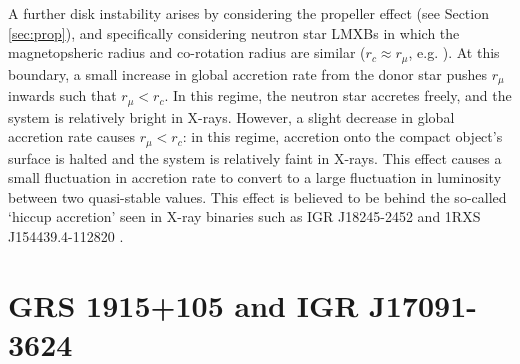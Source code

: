 \par A further disk instability arises by considering the propeller effect (see Section \ref{sec:prop}), and specifically considering neutron star LMXBs in which the magnetopsheric radius and co-rotation radius are similar ($r_c\approx r_\mu$, e.g. \citealp{Spruit_Type2Mod}).  At this boundary, a small increase in global accretion rate from the donor star pushes $r_\mu$ inwards such that $r_\mu<r_c$.  In this regime, the neutron star accretes freely, and the system is relatively bright in X-rays.  However, a slight decrease in global accretion rate causes $r_\mu<r_c$: in this regime, accretion onto the compact object's surface is halted and the system is relatively faint in X-rays.  This effect causes a small fluctuation in accretion rate to convert to a large fluctuation in luminosity between two quasi-stable values.  This effect is believed to be behind the so-called `hiccup accretion' seen in X-ray binaries such as IGR J18245-2452 \citep{Ferrigno_TMSPVar} and 1RXS J154439.4-112820 \citep{Bogdanov_Proxy}.

\section{GRS 1915+105 and IGR J17091-3624}

\label{sec:1915}

